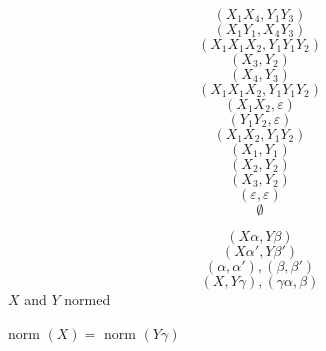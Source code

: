 \documentclass{article}
\begin{document}
$$(X_1X_4, Y_1Y_3)$$
$$(X_1Y_1,X_4Y_3)$$
$$(X_1X_1X_2,Y_1Y_1Y_2)$$
$$(X_3,Y_2)$$
$$(X_4,Y_3)$$
$$(X_1X_1X_2,Y_1Y_1Y_2)$$
$$(X_1X_2,\varepsilon)$$
$$(Y_1Y_2,\varepsilon)$$
$$(X_1X_2,Y_1Y_2)$$
$$(X_1,Y_1)$$
$$(X_2,Y_2)$$
$$(X_3,Y_2)$$
$$(\varepsilon,\varepsilon)$$
$$\emptyset$$

$$(X\alpha, Y\beta)$$
$$(X\alpha', Y\beta')$$
$$(\alpha, \alpha'), (\beta,\beta')$$
$$(X,Y\gamma), (\gamma \alpha, \beta)$$
$X$ and $Y$ normed

norm $(X)=$ norm $(Y\gamma)$
\end{document}
